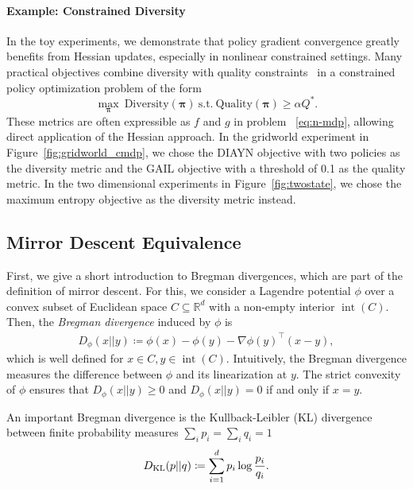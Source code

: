 \documentclass{article}
\theoremstyle{plain}
\theoremstyle{definition}
\theoremstyle{remark}
\begin{document}
\paragraph{Example: Constrained Diversity}
In the toy experiments, we demonstrate that policy gradient convergence greatly benefits from Hessian updates, especially in nonlinear constrained settings.
Many practical objectives combine diversity with quality constraints~\citep{kumar2020one, zahavy2021discovering, zahavy2022discovering, sun2024prompt, kolev2025dual, grillotti2024quality} in a constrained policy optimization problem of the form
\begin{equation}
\max_{\boldsymbol\pi} \ \mathrm{Diversity}(\boldsymbol\pi) \ \text{s.t.} \ \mathrm{Quality}(\boldsymbol\pi) \ge \alpha Q^*.
\end{equation}
These metrics are often expressible as $f$ and $g$ in problem ~\ref{eq:n-mdp}, allowing direct application of the Hessian approach. 
In the gridworld experiment in Figure~\ref{fig:gridworld_cmdp}, we chose the DIAYN objective with two policies as the diversity metric and the GAIL objective with a threshold of 0.1 as the quality metric.
In the two dimensional experiments in Figure~\ref{fig:twostate}, we chose the maximum entropy objective as the diversity metric instead.

\subsection{Mirror Descent Equivalence}\label{app:mirror-descent-equivalence}

First, we give a short introduction to Bregman divergences, which are part of the definition of mirror descent. 
For this, we consider a Lagendre potential $\phi$ over a convex subset of Euclidean space $C\subseteq\mathbb R^d$ with a non-empty interior $\operatorname{int}(C)$. 
Then, the \emph{Bregman divergence} induced by $\phi$ is
\begin{align}
    D_\phi(x||y) \coloneqq \phi(x) - \phi(y) - \nabla \phi(y)^\top(x-y),
\end{align}
which is well defined for $x\in C, y\in\operatorname{int}(C)$. 
Intuitively, the Bregman divergence measures the difference between $\phi$ and its linearization at $y$. 
The strict convexity of $\phi$ ensures that $D_\phi(x||y) \ge 0$ and $D_\phi(x||y) = 0$ if and only if $x=y$. 

An important Bregman divergence is the Kullback-Leibler (KL) divergence between finite probability measures $\sum_i p_i=\sum_i q_i=1$
\begin{align}
    D_{\mathrm{KL}}(p||q) \coloneqq \sum_{i=1}^d p_i \log \frac{p_i}{q_i}. 
\end{align}
\end{document}
